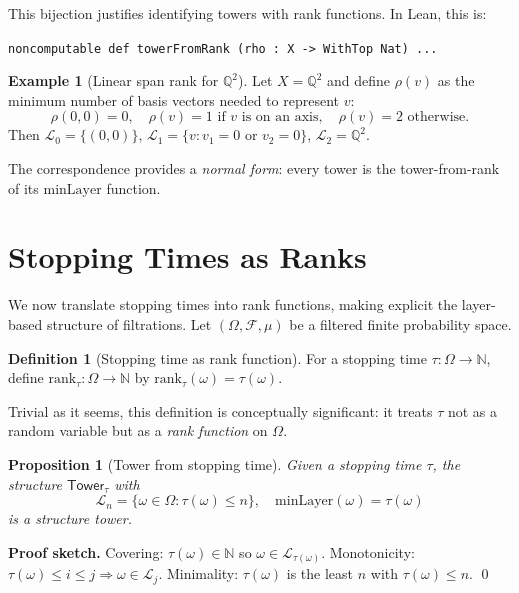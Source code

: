 \documentclass[11pt]{article}
\newtheorem{proposition}[theorem]{Proposition}
\theoremstyle{definition}
\newtheorem{definition}[theorem]{Definition}
\newtheorem{example}[theorem]{Example}
\theoremstyle{remark}
\newcommand{\layer}{\mathcal{L}}
\newcommand{\minLayer}{\mathrm{minLayer}}
\newcommand{\rank}{\mathrm{rank}}
\newcommand{\Tower}{\mathsf{Tower}}
\newcommand{\Filtration}{\mathcal{F}}
\newcommand{\NN}{\mathbb{N}}
\newcommand{\QQ}{\mathbb{Q}}
\begin{document}
This bijection justifies identifying towers with rank functions.
In Lean, this is:

\texttt{noncomputable def towerFromRank (rho : X -> WithTop Nat) ...}

\begin{example}[Linear span rank for $\QQ^2$]
\label{ex:vec2q}
Let $X = \QQ^2$ and define $\rho(v)$ as the minimum number of basis vectors needed to represent $v$:
\[
\rho(0,0) = 0, \quad \rho(v) = 1 \text{ if $v$ is on an axis}, \quad \rho(v) = 2 \text{ otherwise}.
\]
Then $\layer_0 = \{(0,0)\}$, $\layer_1 = \{v : v_1 = 0 \text{ or } v_2 = 0\}$, $\layer_2 = \QQ^2$.
\end{example}

The correspondence provides a \emph{normal form}: every tower is the tower-from-rank of its $\minLayer$ function.

\section{Stopping Times as Ranks}
\label{sec:stopping-rank}

We now translate stopping times into rank functions, making explicit the layer-based structure of filtrations.
Let $(\Omega, \Filtration, \mu)$ be a filtered finite probability space.

\begin{definition}[Stopping time as rank function]
\label{def:stopping-as-rank}
For a stopping time $\tau: \Omega \to \NN$, define $\rank_\tau: \Omega \to \NN$ by $\rank_\tau(\omega) = \tau(\omega)$.
\end{definition}

Trivial as it seems, this definition is conceptually significant: it treats $\tau$ not as a random variable but as a \emph{rank function} on $\Omega$.

\begin{proposition}[Tower from stopping time]
\label{prop:tower-from-stopping-time}
Given a stopping time $\tau$, the structure $\Tower_\tau$ with
\[
\layer_n = \{\omega \in \Omega : \tau(\omega) \leq n\}, \quad \minLayer(\omega) = \tau(\omega)
\]
is a structure tower.
\end{proposition}

\noindent\textbf{Proof sketch.}
Covering: $\tau(\omega) \in \NN$ so $\omega \in \layer_{\tau(\omega)}$.
Monotonicity: $\tau(\omega) \leq i \leq j \Rightarrow \omega \in \layer_j$.
Minimality: $\tau(\omega)$ is the least $n$ with $\tau(\omega) \leq n$.
\qed
\end{document}
